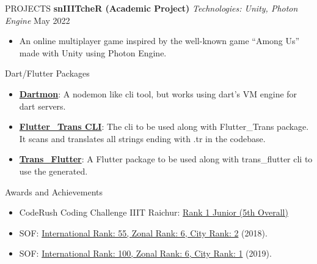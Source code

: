 \documentclass{resume} %
\begin{document}
\begin{rSection}{PROJECTS}
\textbf{snIIITcheR (Academic Project)} \textit{Technologies: Unity, Photon Engine} \hfill May 2022
 \begin{itemize}
    \itemsep -3pt {} 
     \item An online multiplayer game inspired by the well-known game “Among Us” made with Unity using Photon Engine.
 \end{itemize}

\end{rSection}

\begin{rSection}{Dart/Flutter Packages}
    \begin{itemize}
        \item \textbf{\href{https://pub.dev/packages/dartmon_cli}{Dartmon}}: A nodemon like cli tool, but works using dart's VM engine for dart servers. 
        
        \item \textbf{\href{https://pub.dev/packages/fluttertrans}{Flutter\_Trans CLI}}: The cli to be used along with Flutter\_Trans package. It scans and translates all strings ending with .tr in the codebase. 
        
        \item \textbf{\href{https://pub.dev/packages/trans_flutter}{Trans\_Flutter}}: A Flutter package to be used along with trans\_flutter cli to use the generated.
    
    \end{itemize}
\end{rSection}


\begin{rSection}{Awards and Achievements}

 \begin{itemize}
    \itemsep -3pt {}
     \item CodeRush Coding Challenge IIIT Raichur: \href{https://drive.google.com/file/d/1BdOPAlKCXyNEZf-ujJ5Iu8lBBra77hJg/view?usp=sharing}{Rank 1 Junior (5th Overall)}
     \item SOF: \href{https://drive.google.com/file/d/1b_JE3MbNI2eW9xpYvC1NWCfUGChuEVBy/view?usp=sharing}{International Rank: 55, Zonal Rank: 6, City Rank: 2} (2018).
     \item SOF: \href{https://drive.google.com/file/d/1bnRRCB6FZKDpJm0-Ogz15o56iG2QN_1t/view?usp=sharing}{International Rank: 100, Zonal Rank: 6, City Rank: 1} (2019).
 \end{itemize}

\end{rSection}
\end{document}
